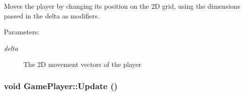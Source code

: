 Moves the player by changing its position on the 2D grid, using the dimensions passed in the delta as modifiers.

\begin{Desc}
\item[Parameters:]
\begin{description}
\item[{\em delta}]The 2D movement vectors of the player \end{description}
\end{Desc}
\hypertarget{class_game_player_55dbf88a7edd4c41de5591c0a3496847}{
\subsubsection[{Update}]{\setlength{\rightskip}{0pt plus 5cm}void GamePlayer::Update ()}}
\label{d7/df6/class_game_player_55dbf88a7edd4c41de5591c0a3496847}


